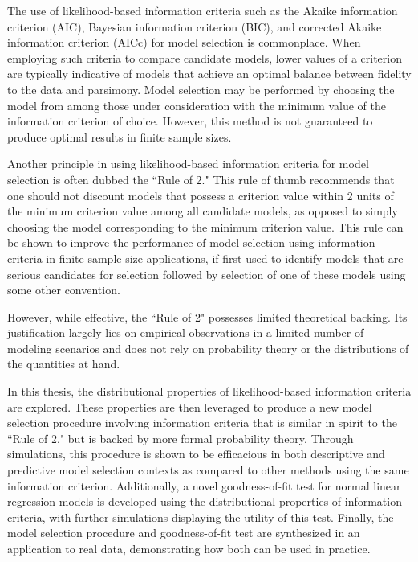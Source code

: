 {
The use of likelihood-based information criteria such as the Akaike information criterion (AIC), Bayesian information criterion (BIC),
and corrected Akaike information criterion (AICc) for model selection is commonplace. When employing such criteria to compare candidate models,
lower values of a criterion are typically indicative of models that achieve an optimal balance between fidelity to the data and parsimony. Model 
selection may be performed by choosing the model from among those under consideration with the minimum value of the information
criterion of choice. However, this method is not guaranteed to produce optimal results in finite sample sizes.

Another principle in using likelihood-based information criteria for model selection is often dubbed the ``Rule of 2." This rule
of thumb recommends that one should not discount models that possess a criterion value within 2 units of the minimum criterion value among
all candidate models, as opposed to simply choosing the model corresponding to the minimum criterion value. This rule can be shown to improve the performance
of model selection using information criteria in finite sample size applications, if first used to identify models that are serious candidates for
selection followed by selection of one of these models using some other convention.

However, while effective, the ``Rule of 2" possesses limited theoretical backing. Its justification largely lies on empirical observations
in a limited number of modeling scenarios and does not rely on probability theory or the distributions of the quantities at hand.

In this thesis, the distributional properties of likelihood-based information criteria are explored. These properties are then leveraged
to produce a new model selection procedure involving information criteria that is similar in spirit to the ``Rule of 2," but is backed
by more formal probability theory. Through simulations, this procedure is shown to be efficacious in both descriptive and predictive model selection
contexts as compared to other methods using the same information criterion. Additionally, a novel goodness-of-fit test
for normal linear regression models is developed using the distributional properties of information criteria, with further simulations
displaying the utility of this test. Finally, the model selection procedure and goodness-of-fit test are synthesized in an application
to real data, demonstrating how both can be used in practice.

}

